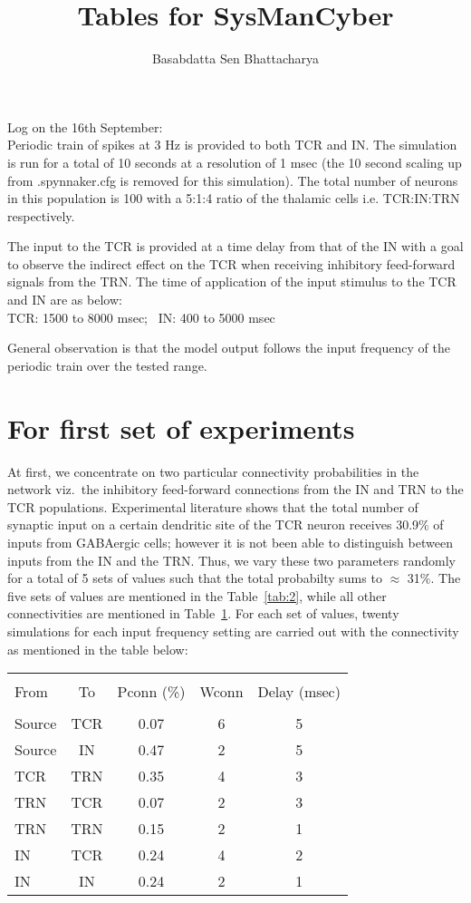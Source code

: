 \documentclass[11pt,a4paper]{article}
\author{Basabdatta Sen Bhattacharya}
\title{Tables for SysManCyber}
\begin{document}
Log on the 16th September:\\
Periodic train of spikes at 3 Hz is provided to both TCR and IN. The simulation is run for a total of 10 seconds at a resolution of 1 msec (the 10 second scaling up from .spynnaker.cfg is removed for this simulation). The total number of neurons in this population is 100 with a 5:1:4 ratio of the thalamic cells i.e. TCR:IN:TRN respectively.

The input to the TCR is provided at a time delay from that of the IN with a goal to observe the indirect effect on the TCR when receiving inhibitory feed-forward signals from the TRN. The time of application of the input stimulus to the TCR and IN are as below:\\
TCR: 1500 to 8000 msec; \, IN: 400 to 5000 msec

General observation is that the model output follows the input frequency of the periodic train over the tested range.
\section{For first set of experiments}
\label{sec:1}
At first, we concentrate on two particular connectivity probabilities in the network viz.\ the inhibitory feed-forward connections from the IN and TRN to the TCR populations. Experimental literature shows that the total number of synaptic input on a certain dendritic site of the TCR neuron receives 30.9\% of inputs from GABAergic cells; however it is not been able to distinguish between inputs from the IN and the TRN. Thus, we vary these two parameters randomly for a total of 5 sets of values such that the total probabilty sums to $\approx$ 31\%. The five sets of values are mentioned in the Table~\ref{tab:2}, while all other connectivities are mentioned in Table~\ref{tab:1}. For each set of values, twenty simulations for each input frequency setting are carried out with the connectivity as mentioned in the table below:
\begin{table}
\begin{tabular}{||l|c|c|c|c||}
\hline \\
From & To & Pconn (\%) & Wconn & Delay (msec) \\
\hline \hline \\
Source & TCR & 0.07 & 6 & 5\\
Source & IN & 0.47 & 2 & 5 \\
TCR & TRN & 0.35 & 4 & 3 \\
TRN & TCR & 0.07 & 2 & 3 \\
TRN & TRN & 0.15 & 2 & 1 \\
IN & TCR & 0.24 & 4 & 2 \\
IN & IN & 0.24 & 2 & 1 \\
\hline \hline
\end{tabular}
\label{tab:1}
\end{table}
\end{document}
